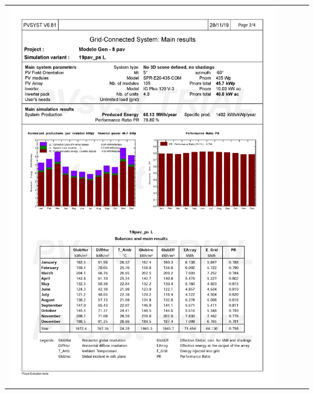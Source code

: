 \begin{table}[H]
    \centering
    \begin{tabular}{l}
        \includegraphics[width=0.9\textwidth]{figures/attachments/resultpv30.jpg}
    \end{tabular}
\end{table}
\pagebreak
